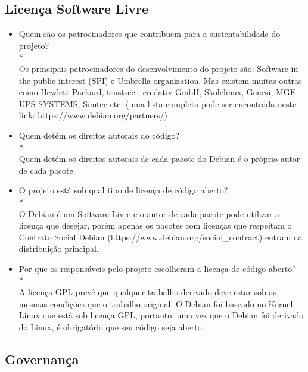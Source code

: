 \documentclass[12pt,a4paper]{article} %
\begin{document}
\subsection{Licença Software Livre}


\begin{itemize}
\item Quem são os patrocinadores que contribuem para a sustentabilidade do projeto?
\\*
\\Os principais patrocinadores do desenvolvimento do projeto são: Software in the public interest (SPI) e Umbrella organization. Mas existem muitas outras como Hewlett-Packard, trustsec , credativ GmbH, Skolelinux, Genesi, MGE UPS SYSTEMS, Simtec etc. (uma lista completa pode ser encontrada neste link: https://www.debian.org/partners/)
\linebreak


\item Quem detém os direitos autorais do código?
\\*
\\Quem detém os direitos autorais de cada pacote do Debian é o próprio autor de cada pacote.
\linebreak
\item O projeto está sob qual tipo de licença de código aberto?
\\*
\\O Debian é um Software Livre e o autor de cada pacote pode utilizar a licença que desejar, porém apenas os pacotes com licenças que respeitam o Contrato Social Debian (https://www.debian.org/social_contract) entram na distribuição principal.
\linebreak

\item Por que os responsáveis pelo projeto escolheram a licença de código aberto?
\\*
\\A licença GPL prevê que qualquer trabalho derivado deve estar sob as mesmas condições que o trabalho original. O Debian foi baseado no Kernel Linux que está sob licença GPL, portanto, uma vez que o Debian foi derivado do Linux, é obrigatório que seu código seja aberto.
\linebreak
\end{itemize}

\subsection{Governança}
\end{document}
